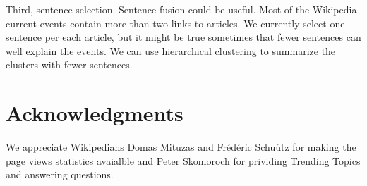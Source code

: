 \documentclass[11pt]{article}
\begin{document}
Third, sentence selection. Sentence fusion could be useful. Most of the Wikipedia current events 
contain more than two links to articles. We currently select one sentence per each article,
but it might be true sometimes that fewer sentences can well explain the events.
We can use hierarchical clustering to summarize the clusters with fewer sentences.

\section*{Acknowledgments}


We appreciate Wikipedians Domas Mituzas and Fr\'{e}d\'{e}ric Schu\"{u}tz
for making the page views statistics avaialble and Peter Skomoroch for
prividing Trending Topics and answering questions.



\end{document}
